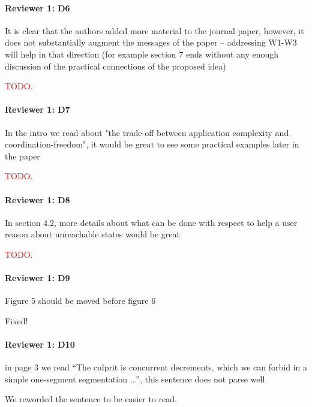 \documentclass[9pt]{article}
\begin{document}
\begin{multicols*}{2}
\paragraph{Reviewer 1: D6}
\begin{feedback}
  It is clear that the authors added more material to the journal paper,
  however, it does not substantially augment the messages of the paper --
  addressing W1-W3 will help in that direction (for example section 7 ends
  without any enough discussion of the practical connections of the proposed
  idea)
\end{feedback}
\textcolor{red}{TODO.}

\paragraph{Reviewer 1: D7}
\begin{feedback}
  In the intro we read about "the trade-off between application complexity and
  coordination-freedom", it would be great to see some practical examples later
  in the paper
\end{feedback}
\textcolor{red}{TODO.}

\paragraph{Reviewer 1: D8}
\begin{feedback}
  In section 4.2, more details about what can be done with respect to help a
  user reason about unreachable states would be great
\end{feedback}
\textcolor{red}{TODO.}

\paragraph{Reviewer 1: D9}
\begin{feedback}
  Figure 5 should be moved before figure 6
\end{feedback}
Fixed!

\paragraph{Reviewer 1: D10}
\begin{feedback}
  in page 3 we read ``The culprit is concurrent decrements, which we can forbid
  in a simple one-segment segmentation ...'', this sentence does not parse well
\end{feedback}
We reworded the sentence to be easier to read.


\end{multicols*}
\end{document}

